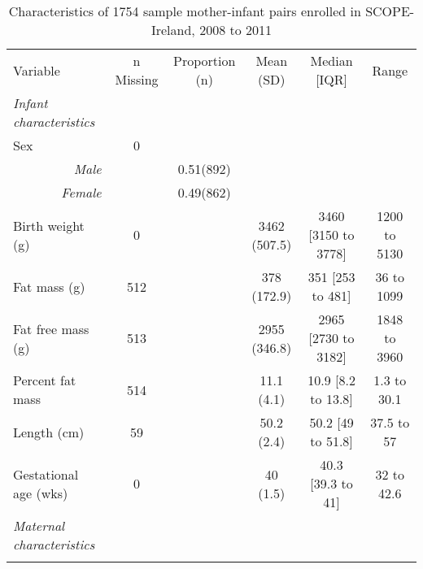 \documentclass[10pt]{article}
\begin{document}
\begin{table}
\captionsetup{width=0.95\textwidth}
\caption {Characteristics of 1754 sample mother-infant pairs enrolled in SCOPE-Ireland, 2008 to 2011}
\begin{threeparttable}
\begin{tabular}{lccccc} 
\toprule

Variable & n Missing & Proportion (n) & Mean (SD) & Median [IQR] & Range  \\
\cmidrule(lr){2-6}
                                           
\addlinespace[6pt]
\textit{Infant characteristics} &   &   &   &   &  \\ 
\addlinespace[3pt]



Sex & 0 &  &  &  &  \\
\multicolumn{1}{r}{\textit{Male}} &   & 0.51(892) &  &  & \\
\multicolumn{1}{r}{\textit{Female}} &   & 0.49(862) &  &  & \\
Birth weight (g) & 0 & & 3462 (507.5) & 3460 [3150 to 3778] & 1200 to 5130 \\
Fat mass (g) & 512 & & 378 (172.9) & 351 [253 to 481] & 36 to 1099 \\
Fat free mass (g) & 513 & & 2955 (346.8) & 2965 [2730 to 3182] & 1848 to 3960 \\
Percent fat mass & 514 & & 11.1 (4.1) & 10.9 [8.2 to 13.8] & 1.3 to 30.1 \\
Length (cm) & 59 & & 50.2 (2.4) & 50.2 [49 to 51.8] & 37.5 to 57 \\
Gestational age (wks) & 0 & & 40 (1.5) & 40.3 [39.3 to 41] & 32 to 42.6 \\




\addlinespace[9pt]
\textit{Maternal characteristics} &   &   &   &   &  \\ 
\addlinespace[3pt]




\end{tabular}
\end{threeparttable}
\end{table}
\end{document}
